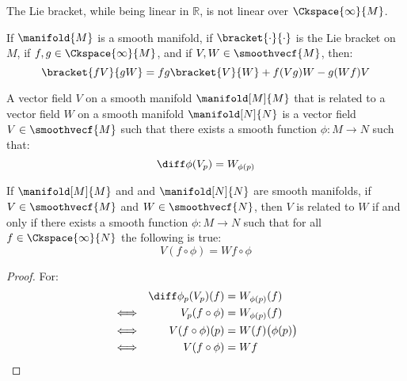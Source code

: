         The Lie bracket, while being linear in $\mathbb{R}$, is not linear
        over $\Ckspace{\infty}{M}$.
        \begin{theorem}
            If $\manifold{M}$ is a smooth manifold, if
            $\bracket{\cdot}{\cdot}$ is the Lie bracket on $M$, if
            $f,g\in\Ckspace{\infty}{M}$, and if $V,W\in\smoothvecf{M}$,
            then:
            \begin{equation}
                \bracket{fV}{gW}=fg\bracket{V}{W}+f(Vg)W-g(Wf)V
            \end{equation}
        \end{theorem}
        \begin{definition}
            A vector field $V$ on a smooth manifold $\manifold[M]{M}$ that
            is related to a vector field $W$ on a smooth manifold
            $\manifold[N]{N}$ is a vector field $V\in\smoothvecf{M}$ such
            that there exists a smooth function $\phi:M\rightarrow{N}$ such
            that:
            \begin{equation}
                \diff\phi(V_{p})=W_{\phi(p)}
            \end{equation}
        \end{definition}
        \begin{theorem}
            If $\manifold[M]{M}$ and and $\manifold[N]{N}$ are smooth
            manifolds, if $V\in\smoothvecf{M}$ and $W\in\smoothvecf{N}$,
            then $V$ is related to $W$ if and only if there exists a
            smooth function $\phi:M\rightarrow{N}$ such that for all
            $f\in\Ckspace{\infty}{N}$ the following is true:
            \begin{equation}
                V(f\circ\phi)=Wf\circ\phi
            \end{equation}
        \end{theorem}
        \begin{proof}
            For:
            \begin{align}
                &&\diff\phi_{p}(V_{p})(f)&=W_{\phi(p)}(f)\\
                &\Longleftrightarrow&
                V_{p}(f\circ\phi)&=W_{\phi(p)}(f)\\
                &\Longleftrightarrow&
                V(f\circ\phi)(p)&=W(f)\big(\phi(p)\big)\\
                &\Longleftrightarrow&
                V(f\circ\phi)&=Wf
            \end{align}
        \end{proof}
